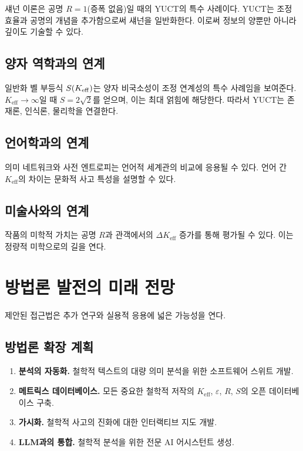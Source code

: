 \documentclass[11pt,a4paper]{article}
\newcommand{\eps}{\varepsilon}
\begin{document}
	섀넌 이론은 공명 \(R = 1\)(증폭 없음)일 때의 YUCT의 특수 사례이다. YUCT는 조정 효율과 공명의 개념을 추가함으로써 섀넌을 일반화한다. 이로써 정보의 양뿐만 아니라 깊이도 기술할 수 있다.
	
	\subsection{양자 역학과의 연계}
	
	일반화 벨 부등식 \(S(\Keff)\)는 양자 비국소성이 조정 연계성의 특수 사례임을 보여준다. \(K_{\mathrm{eff}} \to \infty\)일 때 \(S = 2\sqrt{2}\)를 얻으며, 이는 최대 얽힘에 해당한다. 따라서 YUCT는 존재론, 인식론, 물리학을 연결한다.
	
	\subsection{언어학과의 연계}
	
	의미 네트워크와 사전 엔트로피는 언어적 세계관의 비교에 응용될 수 있다. 언어 간 \(K_{\mathrm{eff}}\)의 차이는 문화적 사고 특성을 설명할 수 있다.
	
	\subsection{미술사와의 연계}
	
	작품의 미학적 가치는 공명 \(R\)과 관객에서의 \(\Delta K_{\mathrm{eff}}\) 증가를 통해 평가될 수 있다. 이는 정량적 미학으로의 길을 연다.
	
	\section{방법론 발전의 미래 전망}
	\label{sec:future-directions}
	
	제안된 접근법은 추가 연구와 실용적 응용에 넓은 가능성을 연다.
	
	\subsection{방법론 확장 계획}
	
	\begin{enumerate}
		\item \textbf{분석의 자동화.} 철학적 텍스트의 대량 의미 분석을 위한 소프트웨어 스위트 개발.
		\item \textbf{메트릭스 데이터베이스.} 모든 중요한 철학적 저작의 \(K_{\mathrm{eff}}\), \(\eps\), \(R\), \(S\)의 오픈 데이터베이스 구축.
		\item \textbf{가시화.} 철학적 사고의 진화에 대한 인터랙티브 지도 개발.
		\item \textbf{LLM과의 통합.} 철학적 분석을 위한 전문 AI 어시스턴트 생성.
	\end{enumerate}
	
\end{document}
